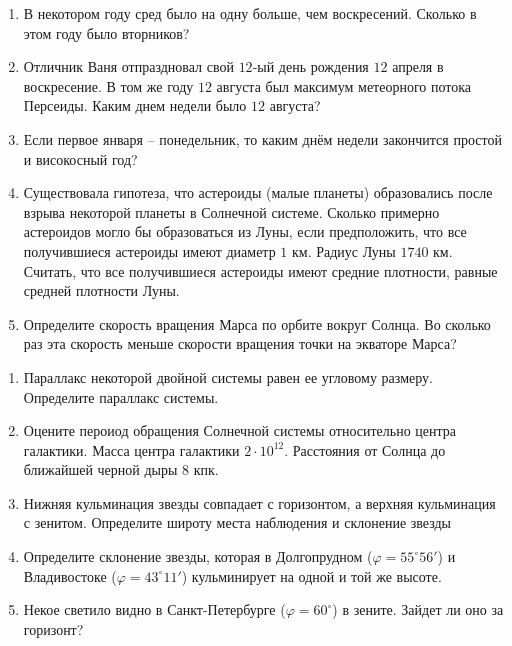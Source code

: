 \documentclass[12pt]{article}
\begin{document}
\begin{enumerate}[label=\textbf{C\arabic*.}]
	\item В некотором году сред было на одну больше, чем воскресений. Сколько в этом году было вторников? %
    \item Отличник Ваня отпраздновал свой $12$-ый день рождения $12$ апреля в воскресение. В том же году $12$ августа был максимум метеорного потока Персеиды. Каким днем недели было $12$ августа? %
    \item Если первое января -- понедельник, то каким днём недели закончится простой и високосный год? %
    \item Существовала гипотеза, что астероиды (малые планеты) образовались после взрыва некоторой планеты в Солнечной системе. Сколько примерно астероидов могло бы образоваться из Луны, если предположить, что все получившиеся астероиды имеют диаметр $1$ км. Радиус Луны $1740$ км. Считать, что все получившиеся астероиды имеют средние плотности, равные средней плотности Луны. %
    \item Определите скорость вращения Марса по орбите вокруг Солнца. Во сколько раз эта скорость меньше скорости вращения точки на экваторе Марса? %
\end{enumerate}

\begin{enumerate}[label=\textbf{D\arabic*.}]
	\item Параллакс некоторой двойной системы равен ее угловому размеру. Определите параллакс системы. %
    \item Оцените пероиод обращения Солнечной системы относительно центра галактики. Масса центра галактики $2\cdot10^{12}$. Расстояния от Солнца до ближайшей черной дыры $8$ кпк. %
    \item Нижняя кульминация звезды совпадает с горизонтом, а верхняя кульминация с зенитом. Определите широту места наблюдения и склонение звезды %
    \item Определите склонение звезды, которая в Долгопрудном ($\varphi = 55^{\circ}56'$) и Владивостоке ($\varphi =43^{\circ}11'$) кульминирует на одной и той же высоте. %
    \item Некое светило видно в Санкт-Петербурге ($\varphi = 60^{\circ}$) в зените. Зайдет ли оно за горизонт? %
\end{enumerate}
\end{document}
